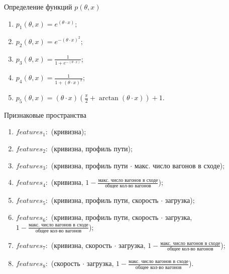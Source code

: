 \documentclass[aspectratio=169]{beamer}
\begin{document}
    
    \begin{frame}{Определение функций $p(\theta, x)$}
        \begin{enumerate}
            \item $p_1(\theta, x) = e^{(\theta \cdot x)}$;
            \item $p_2(\theta, x) = e^{-(\theta \cdot x)^2}$;
            \item $p_3(\theta, x) = \frac{1}{1+e^{-(\theta \cdot x)}}$;
            \item $p_4(\theta, x) = \frac{1}{1 + (\theta \cdot x)^2}$;
            \item $p_5(\theta, x) = (\theta \cdot x) (\frac{\pi}{2} + \arctan(\theta \cdot x)) + 1$.
        \end{enumerate}
    \end{frame}


    \begin{frame}{Признаковые пространства}
        \begin{enumerate}
            \item $features_1:$ (кривизна);
            \item $features_2:$ (кривизна, профиль пути);
            \item $features_3:$ (кривизна, профиль пути $\cdot$ макс. число вагонов в сходе);
            \item $features_4:$ (кривизна, $1 - \frac{\text{макс. число вагонов в сходе}}{\text{общее кол-во вагонов}}$);
            \item $features_5:$ (кривизна, профиль пути, скорость $\cdot$ загрузка);
            \item $features_6:$ (кривизна, профиль пути, скорость $\cdot$ загрузка,\\ $1 - \frac{\text{макс. число вагонов в сходе}}{\text{общее кол-во вагонов}}$);
            \item $features_7:$ (кривизна, скорость $\cdot$ загрузка, $1 - \frac{\text{макс. число вагонов в сходе}}{\text{общее кол-во вагонов}}$);
            \item $features_8:$ (скорость $\cdot$ загрузка, $1 - \frac{\text{макс. число вагонов в сходе}}{\text{общее кол-во вагонов}}$).
            \newline
        \end{enumerate}
    \end{frame}

    
\end{document}
